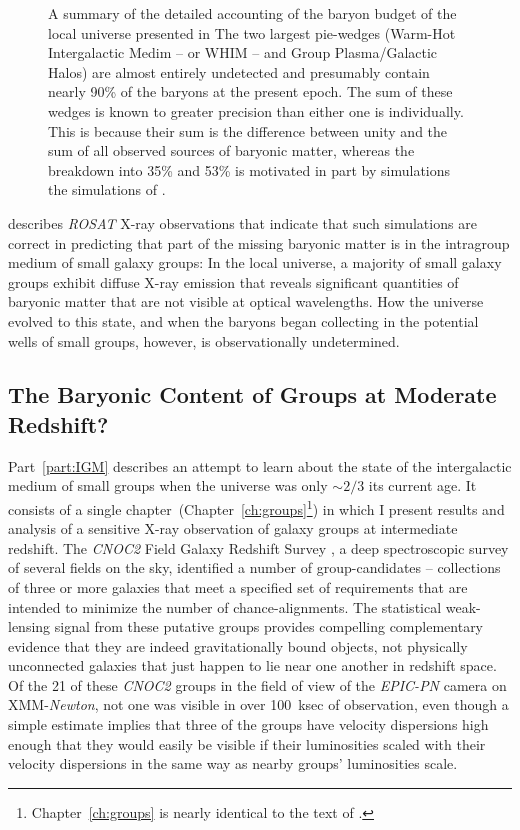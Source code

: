 \begin{figure}[p]
\caption[Local universe baryon budget.]{A summary of the detailed
accounting of the baryon budget of the local universe presented in
\citet{fukugita+peebles2004} The two largest pie-wedges (Warm-Hot
Intergalactic Medim -- or WHIM -- and Group Plasma/Galactic Halos) are
almost entirely undetected and presumably contain nearly 90\% of the
baryons at the present epoch.  The sum of these wedges is known to
greater precision than either one is individually.  This is because
their sum is the difference between unity and the sum of all observed
sources of baryonic matter, whereas the breakdown into 35\% and 53\%
is motivated in part by simulations the simulations of
\citet{dave_et_al2001}.}
\label{intro_fig:piechart}
\end{figure}
\afterpage{\clearpage}

\citet{mulchaey2000} describes \textsl{ROSAT} X-ray observations that
indicate that such simulations are correct in predicting that part of
the missing baryonic matter is in the intragroup medium of small
galaxy groups: In the local universe, a majority of small galaxy
groups exhibit diffuse X-ray emission that reveals significant
quantities of baryonic matter that are not visible at optical
wavelengths.  How the universe evolved to this state, and when the
baryons began collecting in the potential wells of small groups,
however, is observationally undetermined.

\subsection[The Baryonic Content of Groups at Moderate Redshift?]{The Baryonic Content of Groups at Moderate Redshift?}
\label{intro_ssec:groups}
Part~\ref{part:IGM} describes an attempt to learn about the state of
the intergalactic medium of small groups when the universe was only
$\sim 2/3$ its current age.  It consists of a single
chapter~(Chapter~\ref{ch:groups}\footnote{Chapter~\ref{ch:groups} is
nearly identical to the text of \citet{spiegel_et_al2007a}.}) in which
I present results and analysis of a sensitive X-ray observation of
galaxy groups at intermediate redshift.  The \textsl{CNOC2} Field
Galaxy Redshift Survey \citep{carlberg2001eg,carlberg2001gg}, a deep
spectroscopic survey of several fields on the sky, identified a number
of group-candidates -- collections of three or more galaxies that meet
a specified set of requirements that are intended to minimize the
number of chance-alignments.  The statistical weak-lensing signal from
these putative groups \citep{hoekstra_et_al2003CNOC2} provides
compelling complementary evidence that they are indeed gravitationally
bound objects, not physically unconnected galaxies that just happen to
lie near one another in redshift space.  Of the 21 of these
\textsl{CNOC2} groups in the field of view of the \textsl{EPIC-PN}
camera on XMM-{\it Newton}, not one was visible in over 100~ksec of
observation, even though a simple estimate implies that three of the
groups have velocity dispersions high enough that they would easily be
visible if their luminosities scaled with their velocity dispersions
in the same way as nearby groups' luminosities scale.

